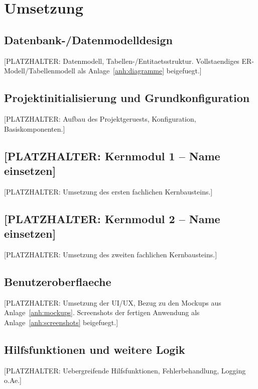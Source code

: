 \chapter{Umsetzung}
\label{ch:umsetzung}


\section{Datenbank-/Datenmodelldesign}
[PLATZHALTER: Datenmodell, Tabellen-/Entitaetsstruktur. Vollstaendiges
ER-Modell/Tabellenmodell als Anlage~\ref{anh:diagramme} beigefuegt.]

\section{Projektinitialisierung und Grundkonfiguration}
[PLATZHALTER: Aufbau des Projektgeruests, Konfiguration, Basiskomponenten.]

\section{[PLATZHALTER: Kernmodul 1 -- Name einsetzen]}
[PLATZHALTER: Umsetzung des ersten fachlichen Kernbausteins.]

\section{[PLATZHALTER: Kernmodul 2 -- Name einsetzen]}
[PLATZHALTER: Umsetzung des zweiten fachlichen Kernbausteins.]

\section{Benutzeroberflaeche}
[PLATZHALTER: Umsetzung der UI/UX, Bezug zu den Mockups aus
Anlage~\ref{anh:mockups}. Screenshots der fertigen Anwendung als
Anlage~\ref{anh:screenshots} beigefuegt.]

\section{Hilfsfunktionen und weitere Logik}
[PLATZHALTER: Uebergreifende Hilfsfunktionen, Fehlerbehandlung, Logging o.Ae.]
